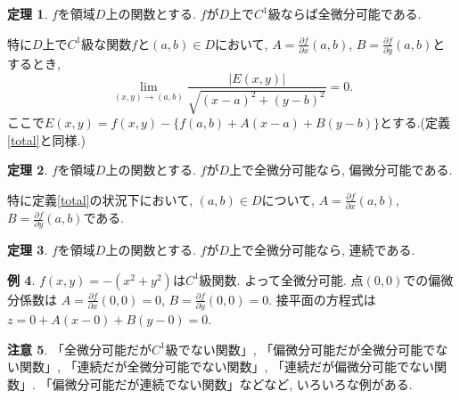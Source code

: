 \documentclass[dvipdfmx,a4paper,11pt]{article}
\theoremstyle{definition}
\newtheorem{thm}{定理}
\newtheorem{rem}[thm]{注意}
\newtheorem{exa}[thm]{例}
\newcommand{\pdrv}[2]{\frac{\partial #1}{\partial #2}}
\begin{document}
\begin{tcolorbox}[
    colback = white,
    colframe = green!35!black,
    fonttitle = \bfseries,
    breakable = true]
    \begin{thm}
    
    $f$を領域$D$上の関数とする.
    $f$が$D$上で$C^1$級ならば全微分可能である.
    
    特に$D$上で$C^1$級な関数$f$と$(a,b) \in D$において, $A=\pdrv{f}{x}(a,b)$, $B=\pdrv{f}{y}(a,b)$とするとき, 
    $$\lim_{(x,y) \rightarrow (a,b)}\frac{|E(x,y)|}{\sqrt{(x-a)^2 + (y-b)^2}} =0.$$
    ここで$E(x,y) = f(x,y)-\{  f(a,b)+ A(x-a) + B(y-b)\}$とする.(定義\ref{total}と同様.)
    \end{thm}
    \end{tcolorbox}
    
    
    
\begin{tcolorbox}[
    colback = white,
    colframe = green!35!black,
    fonttitle = \bfseries,
    breakable = true]
    \begin{thm}
    
    $f$を領域$D$上の関数とする.
    $f$が$D$上で全微分可能なら, 偏微分可能である.
    
    特に定義\ref{total}の状況下において, $(a,b) \in D$について, $A=\pdrv{f}{x}(a,b)$, $B=\pdrv{f}{y}(a,b)$である.
    \end{thm}
    \end{tcolorbox}

\begin{tcolorbox}[
    colback = white,
    colframe = green!35!black,
    fonttitle = \bfseries,
    breakable = true]
    \begin{thm}
    \label{totalconti}
    $f$を領域$D$上の関数とする.
    $f$が$D$上で全微分可能なら, 連続である.
    \end{thm}
    \end{tcolorbox}
    
\begin{exa}
$f(x,y) = -(x^2+ y^2)$は$C^1$級関数. よって全微分可能.
点$(0,0)$での偏微分係数は
$A=\pdrv{f}{x}(0,0) =0$, $B=\pdrv{f}{y}(0,0) =0$.
接平面の方程式は
$z=0+A(x-0)+B(y-0)=0$.

 
\end{exa}

\begin{rem}
「全微分可能だが$C^1$級でない関数」, 「偏微分可能だが全微分可能でない関数」, 「連続だが全微分可能でない関数」, 「連続だが偏微分可能でない関数」. 「偏微分可能だが連続でない関数」などなど, いろいろな例がある.
\end{rem}
\end{document}
